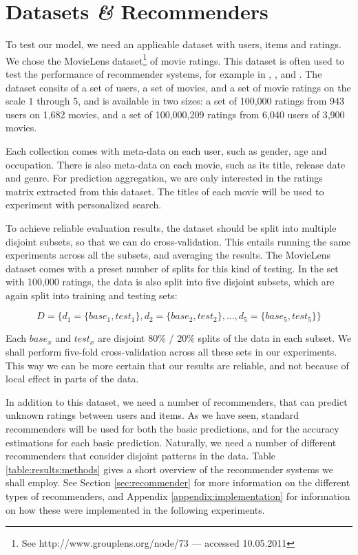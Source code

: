 \section{Datasets \emph{\&} Recommenders}

To test our model, we need an applicable dataset with users, items and ratings.
We chose the MovieLens dataset\footnote{
See http://www.grouplens.org/node/73 --- accessed 10.05.2011} of movie ratings.
This dataset is often used to test the performance of recommender systems,
for example in \citet[p9]{Alshamri2008}, \citet[p4]{Lemire2005}, \citet[p1]{Adomavicius2005}
and \citet[p2]{Herlocker2004}.
The dataset consits of a set of users, a set of movies, and a set of movie ratings
on the scale $1$ through $5$, and is available in two sizes:
a set of 100,000 ratings from 943 users on 1,682 movies,
and a set of 100,000,209 ratings from 6,040 users of 3,900 movies.

Each collection comes with meta-data on each user, such as
gender, age and occupation. There is also meta-data on each movie,
such as its title, release date and genre. 
For prediction aggregation, we are only interested in the ratings matrix
extracted from this dataset.
The titles of each movie will be used to experiment with personalized search.

To achieve reliable evaluation results, the dataset should be split into
multiple disjoint subsets, so that we can do cross-validation.
This entails running the same experiments across all the subsets,
and averaging the results.
The MovieLens dataset comes with a preset number of splits for this kind of testing.
In the set with 100,000 ratings, the data is also split into five disjoint subsets,
which are again split into training and testing sets:

\begin{equation*}
  D = \{ d_1 = \{base_1, test_1\}, d_2 = \{base_2, test_2\}, ..., d_5 = \{base_5, test_5\} \}
\end{equation*}

Each $base_x$ and $test_x$ are disjoint 80\% / 20\% splits of the data in each subset.
We shall perform five-fold cross-validation across all these sets in our experiments.
This way we can be more certain that our results are reliable,
and not because of local effect in parts of the data.

In addition to this dataset, we need a number of recommenders,
that can predict unknown ratings between users and items.
As we have seen, standard recommenders will be used for both the basic predictions,
and for the accuracy estimations for each basic prediction.
Naturally, we need a number of different recommenders that consider
disjoint patterns in the data. Table \ref{table:results:methods}
gives a short overview of the recommender systems we shall employ.
See Section \ref{sec:recommender} for more information on the different
types of recommenders, and Appendix \ref{appendix:implementation}
for information on how these were implemented in the following experiments.

